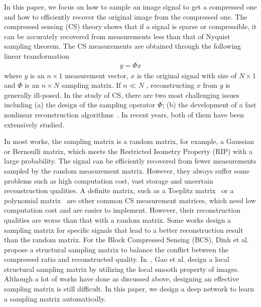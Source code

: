 \documentclass[5pt]{article}
\begin{document}
In this paper, we focus on how to sample an image signal to get a compressed one and how to efficiently recover the original image from the compressed one. The compressed sensing (CS) theory shows that if a signal is sparse or compressible, it can be accurately recovered from measurements less than that of Nyquist sampling theorem. The CS measurements are obtained through the following linear transformation
\begin{eqnarray}
y = \Phi x
\end{eqnarray}
where $y$ is an $n \times 1$  measurement vector, $x$ is the original signal with size of $N \times 1$  and $\Phi $  is an $n \times N$  sampling matrix. If $n \ll N$ , reconstructing $x$ from $y$ is generally ill-posed. In the study of CS, there are two most challenging issues including (a) the design of the sampling operator $\Phi$; (b) the development of a fast nonlinear reconstruction algorithms~\cite{rf1}. In recent years, both of them have been extensively studied.

In most works, the sampling matrix is a random matrix, for example, a Gaussian or Bernoulli matrix, which meets the Restricted Isometry Property (RIP) with a large probability. The signal can be efficiently recovered from fewer measurements sampled by the random measurement matrix. However, they always suffer some problems such as high computation cost, vast storage and uncertain reconstruction qualities. A definite matrix, such as a Toeplitz matrix~\cite{rf2} or a polynomial matrix~\cite{rf3} are other common CS measurement matrices, which need low computation cost and are easier to implement. However, their reconstruction qualities are worse than that with a random matrix. Some works design a sampling matrix for specific signals that lead to a better reconstruction result than the random matrix. For the Block Compressed Sensing (BCS), Dinh et al.~\cite{rf4} propose a structural sampling matrix to balance the conflict between the compressed ratio and reconstructed quality. In~\cite{rf5}, Gao et al. design a local structural sampling matrix by utilizing the local smooth property of images. Although a lot of works have done as discussed above, designing an effective sampling matrix is still difficult. In this paper, we design a deep network to learn a sampling matrix automatically.
\end{document}
